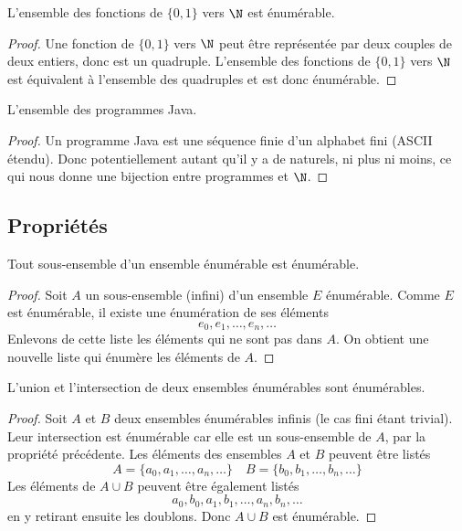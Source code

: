 \begin{myexem}
 L'ensemble des fonctions de  $\{0, 1\}$ vers $\N$ est énumérable.
 \begin{proof}
  Une fonction de $\{0, 1\}$ vers $\N$ peut être représentée par deux couples de deux entiers, donc est un quadruple. L'ensemble des fonctions de $\{0, 1\}$ vers $\N$ est équivalent à l'ensemble des quadruples et est donc énumérable.
 \end{proof}
\end{myexem}
 
 \begin{myexem}
 \label{exem:programme_java}
  L'ensemble des programmes Java.
  \begin{proof}
   Un programme Java est une séquence finie d'un alphabet fini (ASCII étendu). Donc potentiellement autant qu'il y a de naturels, ni plus ni moins, ce qui nous donne une bijection entre programmes et $\N$. 
  \end{proof}
\end{myexem}

\subsection{Propriétés}
\label{subsec:proprietes}

\begin{myprop}
	Tout sous-ensemble d'un ensemble énumérable est énumérable.
	\begin{proof}
Soit $A$ un sous-ensemble (infini) d'un ensemble $E$ énumérable.  Comme $E$ est énumérable, il existe une énumération de ses éléments
\[
e_0, e_1, \ldots , e_n, \ldots
\]
Enlevons de cette liste les éléments qui ne sont pas dans $A$.  On obtient une nouvelle liste qui énumère les éléments de $A$.
	\end{proof}
\end{myprop}

\begin{myprop}
	L'union et l'intersection de deux ensembles énumérables sont énumérables.
	\begin{proof}
		Soit $A$ et $B$ deux ensembles énumérables infinis (le cas fini étant trivial).  Leur intersection est énumérable car elle est un sous-ensemble de $A$, par la propriété précédente.   Les éléments des ensembles $A$ et $B$ peuvent être listés
\[
A = \{ a_0, a_1, \ldots , a_n, \ldots\}  \quad
B = \{ b_0, b_1, \ldots , b_n, \ldots\} 
\]
Les éléments de $A \cup B$ peuvent être également listés 
\[
a_0, b_0, a_1, b_1, \ldots, a_n, b_n, \ldots
\]
en y retirant ensuite les doublons. Donc $A \cup B$ est énumérable.
	\end{proof}
\end{myprop}

